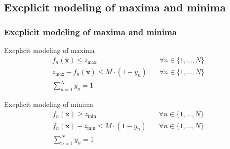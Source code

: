 \subsection{Excplicit modeling of maxima and minima}
\begin{frame}
 \frametitle{Excplicit modeling of maxima and minima}
 \begin{block}{Excplicit modeling of maxima}
 \[
  \begin{array}{ll}
    f_n(\mathbf{\overline{x}}) \leq z_{\max} & \quad\forall n\in\{1,\ldots, N\} \\[2ex]
    z_{\max} - f_n(\mathbf{\overline{x}}) \leq M\cdot(1-y_n)&\quad\forall n\in\{1,\ldots, N\} \\[2ex]
    \sum_{n=1}^N y_n = 1& 
  \end{array}
 \]
 \end{block}
 \begin{block}{Excplicit modeling of minima}
 \[
  \begin{array}{ll}
    f_n(\mathbf{\overline{x}}) \geq z_{\min} & \quad\forall n\in\{1,\ldots, N\} \\[2ex]
    f_n(\mathbf{\overline{x}}) - z_{\min} \leq M\cdot(1-y_n)&\quad\forall n\in\{1,\ldots, N\} \\[2ex]
    \sum_{n=1}^N y_n = 1& 
  \end{array}
 \]
 \end{block}
\end{frame}

